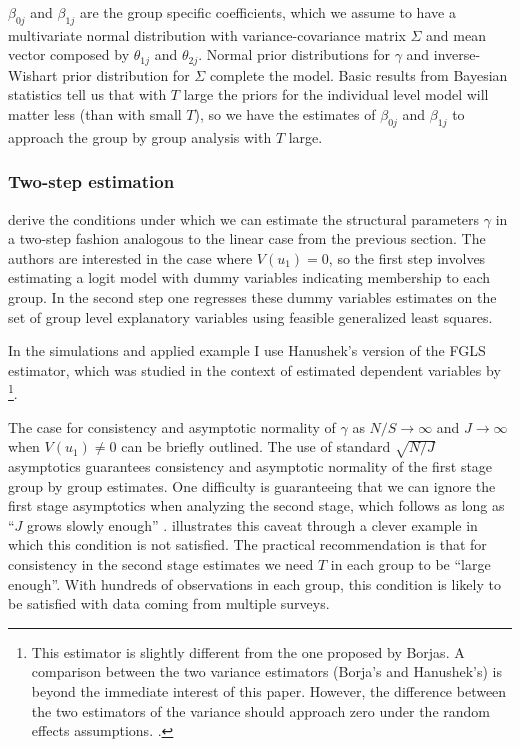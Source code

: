 $\beta_{0j}$ and $\beta_{1j}$ are the group specific coefficients, which we assume to have a multivariate normal distribution with variance-covariance matrix $\Sigma$ and mean vector composed by $\theta_{1j}$ and $\theta_{2j}$. Normal prior distributions for $\gamma$ and inverse-Wishart prior distribution for $\Sigma$ complete the model. Basic results from Bayesian statistics tell us that with $T$ large the priors for the individual level model will matter less (than with small $T$), so we have the estimates of $\beta_{0j}$ and $\beta_{1j}$ to approach the group by group analysis with $T$ large.

\subsubsection{Two-step estimation \label{2slogit}}

\citet{borjas:1994} derive the conditions under which we can estimate the structural parameters $\gamma$ in a two-step fashion analogous to the linear case from the previous section. The authors are interested in the case where $V(u_1)=0$, so the first step involves estimating a logit model with dummy variables indicating membership to each group. In the second step one regresses these dummy variables estimates on the set of group level explanatory variables using feasible generalized least squares.

In the simulations and applied example I use Hanushek's \citeyear{hanushek:1974} version of the FGLS estimator, which was studied in the context of estimated dependent variables by \citet{lewis:2005}\footnote{This estimator is slightly different from the one proposed by Borjas\citep{borjas:1994,borjas:1982}. A comparison between the two variance estimators (Borja's and Hanushek's) is beyond the immediate interest of this paper. However,  the difference between the two estimators of the variance should approach zero under the random effects assumptions. \citep[p.179]{borjas:1994}.}.

The case for consistency and asymptotic normality of $\gamma$ as $N/S\to \infty$ and $J\to\infty$ when $V(u_1)\neq 0$ can be briefly outlined. The use of standard $\sqrt{N/J}$ asymptotics guarantees consistency and asymptotic normality of the first stage group by group estimates. One difficulty is guaranteeing that we can ignore the first stage asymptotics when analyzing the second stage, which follows as long as ``$J$ grows slowly enough'' \citep[p.171][]{borjas:1994}.  \citet{achen:2005} illustrates this caveat through a clever example in which this condition is not satisfied. The practical recommendation is that for consistency in the second stage estimates we need $T$ in each group to be ``large enough''. With hundreds of observations in each group, this condition is likely to be satisfied with data coming from multiple surveys.

